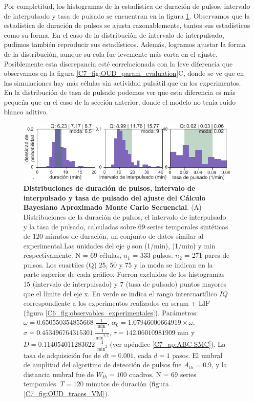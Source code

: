 \documentclass[./main.tex]{subfiles}
\begin{document}
Por completitud, los histogramas de la estadística de duración de pulsos, intervalo de interpulsado y tasa de pulsado se encuentran en la figura \ref{C7_fig:OUD_param_evaluation_hist}. Observamos que la estadística de duración de pulsos se ajusta razonablemente, tantos sus estadísticos como su forma. En el caso de la distribución de intervalo de interpulsado, pudimos también reproducir sus estadísticos. Además, logramos ajustar la forma de la distribución, aunque su cola fue levemente más corta en el ajuste. Posiblemente esta discrepancia esté correlacionada con la leve diferencia que observamos en la figura \ref{C7_fig:OUD_param_evaluation}C, donde se ve que en las simulaciones hay más células sin actividad pulsátil que en los experimentos. En la distribución de tasa de pulsado podemos ver que esta diferencia es más pequeña que en el caso de la sección anterior, donde el modelo no tenía ruido blanco aditivo. 


\begin{figure}
    \centering
    \includegraphics[width=1\columnwidth]{figures/chapter7/C7_OUD_validation_hist.pdf} 
    \caption{\textbf{Distribuciones de duración de pulsos, intervalo de interpulsado y tasa de pulsado del ajuste del Cálculo Bayesiano Aproximado Monte Carlo Secuencial}. (A) Distribuciones de la duración de pulsos, el intervalo de interpulsado y la tasa de pulsado, calculadas sobre 69 series temporales sintéticas de 120 minutos de duración, un conjunto de datos similar al experimental.Las unidades del eje $y$ son (1/min), (1/min) y min respectivamente. N = 69 células, $n_1$ = 333 pulsos, $n_2$ = 271 pares de pulsos. Los cuartiles (Q) 25, 50 y 75 y la moda se indican en la parte superior de cada gráfico. Fueron excluidos de los histogramas 15 (intervalo de interpulsado) y 7 (tasa de pulsado) puntos mayores que el límite del eje x. En verde se indica el rango intercuartílico $IQ$ correspondiente a los experimentos realizados en serum + LIF (figura \ref{C6_fig:observables_experimentales}). Parámetros:  $\omega = 0.650550354855668 \; \frac{1}{\text{ min }}$, $\alpha_0 = 1.07946000664919 \times \omega$, $ \sigma = 0.453496764315301 \; \frac{1}{\text{min}^{3/2}}$, $\tau = 142.06010981909 \; \text{min} $ y $D = 0.114054011283622 \; \frac{1}{\text{min}^{2}}$ (ver apéndice \ref{C7_ap:ABC-SMC}). La tasa de adquisición fue de $dt = 0.001$, cada $d = 1$ pasos. El umbral de amplitud del algoritmo de detección de pulsos fue $A_{th} = 0.9$, y la distancia umbral fue de $W_{th} = 100\text{ cuadros}$. N = $69$ series temporales. $T = 120$ minutos de duración (figura \ref{C7_fig:OUD_traces_VM}).}
    \label{C7_fig:OUD_param_evaluation_hist}
\end{figure} 
\end{document}
